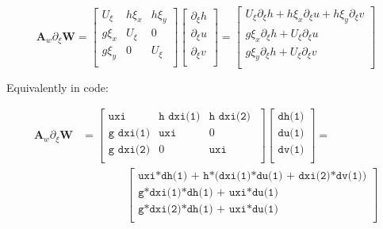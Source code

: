 \documentclass{article}
\newcommand{\code}[1]{\texttt{#1}}
\begin{document}
\[ \mathbf{A}_w \partial_\xi \mathbf{W} = 
\begin{bmatrix}
    U_{\xi} & h \xi_x & h \xi_{y}  \\
    g \xi_x &    U_{\xi}  & 0   \\
    g \xi_y &   0   & U_{\xi}    \\           
\end{bmatrix} 
\begin{bmatrix}
    \partial_\xi h \\
	\partial_\xi u \\
    \partial_\xi v \\
\end{bmatrix}
 =  
	 \begin{bmatrix}
	  U_{\xi}  \partial_\xi h +  h \xi_x  \partial_\xi u + h \xi_{y} \partial_\xi v \\[.1cm]
	  g \xi_x \partial_\xi h  +  U_{\xi} \partial_\xi u    \\[.1cm]
	  g \xi_y  \partial_\xi h  +  U_{\xi}  \partial_\xi v  \\	 	 
\end{bmatrix} 
 \]

Equivalently in code:

\begin{equation*}\label{theta-alt}
\begin{aligned}
\mathbf{A}_w \partial_\xi \mathbf{W}  &=
 \begin{bmatrix}
     \code{uxi} & \code{h dxi(1)} & \code{h  dxi(2) } \\
     \code{g dxi(1)} & \code{uxi} &  0  \\     
     \code{g dxi(2)} & 0 &  \code{uxi}  \\     
\end{bmatrix}
	 \begin{bmatrix}
	 \code{dh(1)} \\
	 \code{du(1)} \\	 
	 \code{dv(1)} \\	 	  	 	 
\end{bmatrix}  = \\
&\qquad\qquad
	 \begin{bmatrix}
	  \code{uxi*dh(1) + h*(dxi(1)*du(1) + dxi(2)*dv(1))} \\
	   \code{g*dxi(1)*dh(1)  + uxi*du(1) } \\ 	 	 	 	 
	   \code{g*dxi(2)*dh(1)  + uxi*du(1) } \\ 	 	 	 	 	   
\end{bmatrix} 
\end{aligned}
\end{equation*}
\end{document}
